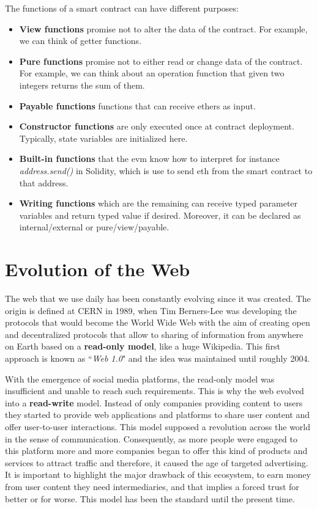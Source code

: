 \documentclass[a4paper,12pt]{article}
\begin{document}
\begin{appendices}
{The functions of a smart contract can have different purposes:
\begin{itemize}
    \item \textbf{View functions} promise not to alter the data of the contract. For example, we can think of getter functions. 
    \item \textbf{Pure functions} promise not to either read or change data of the contract. For example, we can think about an operation function that given two integers returns the sum of them. 
    \item \textbf{Payable functions} functions that can receive ethers as input. 
    \item \textbf{Constructor functions} are only executed once at contract deployment. Typically, state variables are initialized here.
    \item \textbf{Built-in functions} that the \acrshort{evm} know how to interpret for instance \textit{address.send()} in Solidity, which is use to send \acrshort{eth} from the smart contract to that address.
    \item \textbf{Writing functions} which are the remaining can receive typed parameter variables and return typed value if desired. Moreover, it can be declared as internal/external or pure/view/payable. 
\end{itemize}
} 

\section{Evolution of the Web}
\label{appendix:web-evolution}
{The web that we use daily has been constantly evolving since it was created. The origin is defined at CERN in 1989, when Tim Berners-Lee was developing the protocols that would become the World Wide Web with the aim of creating open and decentralized protocols that allow to sharing of information from anywhere on Earth based on a \textbf{read-only model}, like a huge Wikipedia. This first approach is known as ``\textit{Web 1.0}" and the idea was maintained until roughly 2004.

With the emergence of social media platforms, the read-only model was insufficient and unable to reach such requirements. This is why the web evolved into a \textbf{read-write} model. Instead of only companies providing content to users they started to provide web applications and platforms to share user content and offer user-to-user interactions. This model supposed a revolution across the world in the sense of communication. Consequently, as more people were engaged to this platform more and more companies began to offer this kind of products and services to attract traffic and therefore, it caused the age of targeted advertising. It is important to highlight the major drawback of this ecosystem, to earn money from user content they need intermediaries, and that implies a forced trust for better or for worse. This model has been the standard until the present time.

}
\end{appendices}
\end{document}
